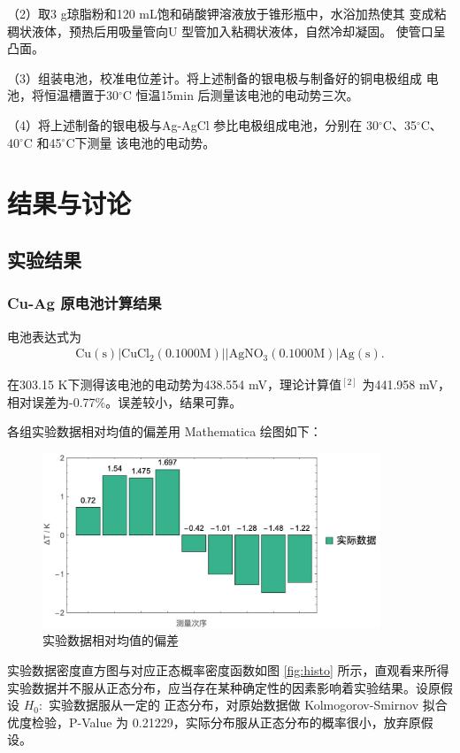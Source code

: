 \documentclass[12pt]{ctexart}
\numberwithin{equation}{section}
\begin{document}
（2）取3 g琼脂粉和120 mL饱和硝酸钾溶液放于锥形瓶中，水浴加热使其
变成粘稠状液体，预热后用吸量管向U 型管加入粘稠状液体，自然冷却凝固。
使管口呈凸面。

（3）组装电池，校准电位差计。将上述制备的银电极与制备好的铜电极组成
电池，将恒温槽置于30$^\circ$C 恒温15min 后测量该电池的电动势三次。

（4）将上述制备的银电极与Ag-AgCl 参比电极组成电池，分别在
30$^\circ$C、35$^\circ$C、40$^\circ$C 和45$^\circ$C下测量
该电池的电动势。

\section{结果与讨论}
\subsection{实验结果}
\subsubsection{Cu-Ag 原电池计算结果}
电池表达式为
\begin{align}
    \mathrm{Cu(s)}|\mathrm{CuCl_2}(0.1000 \mathrm{M})
    ||\mathrm{AgNO_3}(0.1000 \mathrm{M})|\mathrm{Ag(s)}.
\end{align}

在303.15 K下测得该电池的电动势为438.554 mV，理论计算值$^{[2]}$
为441.958 mV，相对误差为-0.77\%。误差较小，结果可靠。

各组实验数据相对均值的偏差用 Mathematica 绘图如下：
\begin{figure}[ht]
    \centering
    \includegraphics[width=0.9\textwidth]{Figure_3.jpg}
    \caption{实验数据相对均值的偏差}
    \label{fig:bar}
\end{figure}

实验数据密度直方图与对应正态概率密度函数如图 \ref*{fig:histo} 所示，直观看来所得实验数据并不服从正态分布，应当存在某种确定性的因素影响着实验结果。设原假设 $H_0:$ 实验数据服从一定的 正态分布，对原始数据做 Kolmogorov-Smirnov 拟合优度检验，P-Value 为 0.21229，实际分布服从正态分布的概率很小，放弃原假设。
\end{document}
